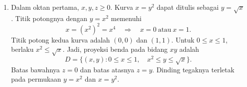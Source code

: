 \documentclass[11pt,a4paper]{article}
\begin{document}
\begin{enumerate}[itemsep=12pt,parsep=5pt]
\begin{center}
\begin{minipage}{0.52\linewidth}
            \par\small Benda di bawah bidang $z=\frac12x$.
          \end{minipage}
        \end{center}

        Karena integrannya $1$, nilai integral sama dengan volume $R$.
        Urutan integrasi dapat dipilih agar batasnya sederhana:
        \begin{align*}
          \iiint_R1\,dV
           & =\int_0^1\int_y^{2-y}\int_0^{x/2}1\,dz\,dx\,dy        \\
           & =\int_0^1\int_y^{2-y}\frac{x}{2}\,dx\,dy              \\
           & =\int_0^1\left[\frac{x^2}{4}\right]_{x=y}^{x=2-y}\,dy \\
           & =\int_0^1\frac{(2-y)^2-y^2}{4}\,dy
          =\int_0^1(1-y)\,dy                                       \\
           & =\left[y-\frac{y^2}{2}\right]_0^1=\boxed{\frac12}.
        \end{align*}

  \item Dalam oktan pertama, $x,y,z\ge0$.
        Kurva $x=y^2$ dapat ditulis sebagai $y=\sqrt{x}$.
        Titik potongnya dengan $y=x^2$ memenuhi
        \[
          x=(x^2)^2=x^4
          \quad\Longrightarrow\quad x=0\ \text{atau}\ x=1.
        \]
        Titik potong kedua kurva adalah $(0,0)$ dan $(1,1)$.
        Untuk $0\le x\le1$, berlaku $x^2\le\sqrt{x}$.
        Jadi, proyeksi benda pada bidang $xy$ adalah
        \[
          D=\{(x,y):0\le x\le1,\quad x^2\le y\le\sqrt{x}\}.
        \]
        Batas bawahnya $z=0$ dan batas atasnya $z=y$.
        Dinding tegaknya terletak pada permukaan $y=x^2$ dan $x=y^2$.


\end{enumerate}
\end{document}

